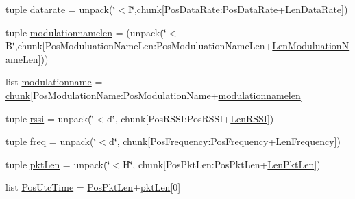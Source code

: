 \begin{DoxyCompactItemize}
\item 
tuple \hyperlink{namespace_tlmy_cmd_processor_1_1_tlmy_cmd_processor_a617a858e77fc14ff5243134c29be790b}{datarate} = unpack(\char`\"{}$<$I\char`\"{},chunk\mbox{[}Pos\+Data\+Rate\+:\+Pos\+Data\+Rate+\hyperlink{namespace_tlmy_cmd_processor_1_1_tlmy_cmd_processor_ad594ffcbc7ad47494749f33e26f93c2b}{Len\+Data\+Rate}\mbox{]})
\item 
tuple \hyperlink{namespace_tlmy_cmd_processor_1_1_tlmy_cmd_processor_ab58241d3bba0b73ecff4c2d4dfa1263e}{modulationnamelen} = (unpack(\char`\"{}$<$B\char`\"{},chunk\mbox{[}Pos\+Moduluation\+Name\+Len\+:\+Pos\+Moduluation\+Name\+Len+\hyperlink{namespace_tlmy_cmd_processor_1_1_tlmy_cmd_processor_a251db0b074d036dc2764b58c8b186a94}{Len\+Moduluation\+Name\+Len}\mbox{]}))
\item 
list \hyperlink{namespace_tlmy_cmd_processor_1_1_tlmy_cmd_processor_a139941b75aab04bfd72966e3c3b88198}{modulationname} = \hyperlink{namespace_tlmy_cmd_processor_1_1_tlmy_cmd_processor_a1ed237493e0f74a1a922ee4b54ef0657}{chunk}\mbox{[}Pos\+Modulation\+Name\+:\+Pos\+Modulation\+Name+\hyperlink{namespace_tlmy_cmd_processor_1_1_tlmy_cmd_processor_ab58241d3bba0b73ecff4c2d4dfa1263e}{modulationnamelen}\mbox{]}
\item 
tuple \hyperlink{namespace_tlmy_cmd_processor_1_1_tlmy_cmd_processor_abcafa9e1e3e4760b2456be9871d9ff07}{rssi} = unpack(\char`\"{}$<$d\char`\"{}, chunk\mbox{[}Pos\+R\+S\+S\+I\+:\+Pos\+R\+S\+S\+I+\hyperlink{namespace_tlmy_cmd_processor_1_1_tlmy_cmd_processor_a879b2c02ed1a38b0c9a0da5f30bdebd2}{Len\+R\+S\+S\+I}\mbox{]})
\item 
tuple \hyperlink{namespace_tlmy_cmd_processor_1_1_tlmy_cmd_processor_ac9f1fd4fc03735dd9b81e06ee6573218}{freq} = unpack(\char`\"{}$<$d\char`\"{}, chunk\mbox{[}Pos\+Frequency\+:\+Pos\+Frequency+\hyperlink{namespace_tlmy_cmd_processor_1_1_tlmy_cmd_processor_abac774909f35b54d636c7b68839964a4}{Len\+Frequency}\mbox{]})
\item 
tuple \hyperlink{namespace_tlmy_cmd_processor_1_1_tlmy_cmd_processor_aa4bf4ee35125c7aaeb50dfe9bd888320}{pkt\+Len} = unpack(\char`\"{}$<$H\char`\"{}, chunk\mbox{[}Pos\+Pkt\+Len\+:\+Pos\+Pkt\+Len+\hyperlink{namespace_tlmy_cmd_processor_1_1_tlmy_cmd_processor_aaa7975541edbc48dcb803ca7acca8e20}{Len\+Pkt\+Len}\mbox{]})
\item 
list \hyperlink{namespace_tlmy_cmd_processor_1_1_tlmy_cmd_processor_a06b32773af37ab235d62d22898dbb777}{Pos\+Utc\+Time} = \hyperlink{namespace_tlmy_cmd_processor_1_1_tlmy_cmd_processor_acba5b0985ab65f322a69d59144555d63}{Pos\+Pkt\+Len}+\hyperlink{namespace_tlmy_cmd_processor_1_1_tlmy_cmd_processor_aa4bf4ee35125c7aaeb50dfe9bd888320}{pkt\+Len}\mbox{[}0\mbox{]}

\end{DoxyCompactItemize}
